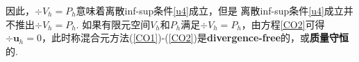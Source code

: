 
因此，$\div V_h=P_h$意味着离散inf-sup条件\eqref{u4}成立，但是
离散inf-sup条件\eqref{u4}成立并不推出$\div V_h=P_h$. 如果有限元空间$ V_h$和$P_h$满足$\div V_h=P_h$，由方程\eqref{CO2}可得$\div\boldsymbol{u}_h=0$，此时称混合元方法(\ref{CO1})-(\ref{CO2})是\textbf{divergence-free}的，或\textbf{质量守恒}的. 

